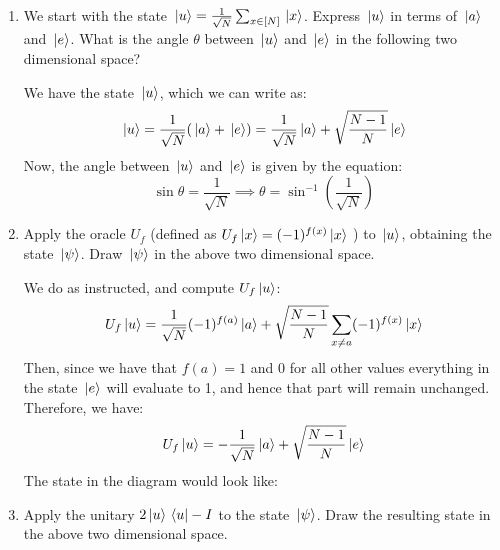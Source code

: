 \documentclass[10pt]{article}
\begin{document}
	\begin{enumerate}[label=\alph*)]
		\item We start with the state \( \ket*{u} = \frac{1}{\sqrt{N} }\sum_{x \in [N]}\ket*{x} \). Express 
			\( \ket*{u} \) in terms of \( \ket*{a} \) and \( \ket*{e} \). What is the angle \( \theta \) between 
			\( \ket*{u} \) and \( \ket*{e} \) in the following two dimensional space? 

			\begin{solution}
				We have the state \( \ket*{u} \), which we can write as: 
				\[
				\ket*{u} = \frac{1}{\sqrt{N} }(\ket*{a} + \ket*{e}) = \frac{1}{\sqrt{N} }\ket*{a} + 
				\sqrt{\frac{N-1}{N}} \ket*{e}
				\] 
				Now, the angle between \( \ket*{u} \) and \( \ket*{e} \) is given by the equation:
				\[
				\sin \theta = \frac{1}{\sqrt{N} } \implies \theta = \sin^{-1}\left( \frac{1}{\sqrt{N} } \right) 
				\] 
			\end{solution}
		\item Apply the oracle \( U_f \) (defined as \( U_f \ket*{x} = (-1)^{f(x)}\ket*{x} \) ) to 
			\( \ket*{u} \), obtaining the state \( \ket*{\psi} \). Draw \( \ket*{\psi} \) in the above two 
			dimensional space.

			\begin{solution}
				We do as instructed, and compute \( U_f \ket*{u} \):
				\begin{align*}
					U_f\ket*{u} &= \frac{1}{\sqrt{N} }(-1)^{f(a)}\ket*{a} + \sqrt{\frac{N-1}{N}} 
					\sum_{x \neq a} (-1)^{f(x)} \ket*{x}\\
				\end{align*}
				Then, since we have that \( f(a) = 1 \) and 0 for all other values everything in the state 
				\( \ket*{e} \) 
				will evaluate to 1, and hence that part will remain unchanged. Therefore, we have:
				\[
				U_f \ket*{u} = -\frac{1}{\sqrt{N} }\ket*{a} + \sqrt{\frac{N-1}{N}} \ket*{e}
				\] 
				The state in the diagram would look like:
				\begin{center}
				\end{center}
			\end{solution}
		\item Apply the unitary \( 2\ket*{u}\bra*{u} - I \) to the state \( \ket*{\psi} \). Draw the resulting 
			state in the above two dimensional space. 


\end{enumerate}
\end{document}
